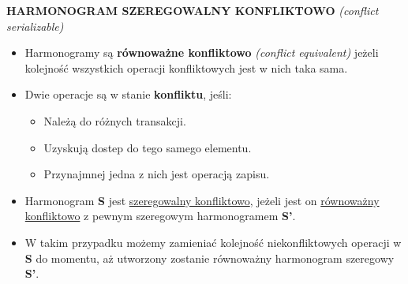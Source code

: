 \textbf{HARMONOGRAM SZEREGOWALNY KONFLIKTOWO}
\textit{(conflict serializable)}
\begin{itemize}
    \item Harmonogramy są \textbf{równoważne konfliktowo}
    \textit{(conflict equivalent)} jeżeli kolejność wszystkich
    operacji konfliktowych jest w nich taka sama.
    \item Dwie operacje są w stanie \textbf{konfliktu}, jeśli:
    \begin{itemize}
        \item Należą do różnych transakcji.
        \item Uzyskują dostep do tego samego elementu.
        \item Przynajmnej jedna z nich jest operacją zapisu.
    \end{itemize}

    \item Harmonogram \textbf{S} jest \underline{szeregowalny konfliktowo},
    jeżeli jest on \underline{równoważny} \underline{konfliktowo} z pewnym
    szeregowym harmonogramem \textbf{S'}.
    \item W takim przypadku możemy zamieniać kolejność niekonfliktowych
    operacji w \textbf{S} do momentu, aż utworzony zostanie równoważny
    harmonogram szeregowy \textbf{S'}.
\end{itemize}

\pagebreak

